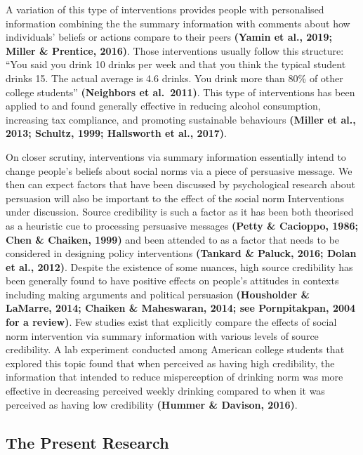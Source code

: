 \documentclass[
  11pt,
]{article}
\begin{document}
A variation of this type of interventions provides people with
personalised information combining the the summary information with
comments about how individuals' beliefs or actions compare to their
peers \textbf{(Yamin et al., 2019; Miller \& Prentice, 2016)}. Those
interventions usually follow this structure: ``You said you drink 10
drinks per week and that you think the typical student drinks 15. The
actual average is 4.6 drinks. You drink more than 80\% of other college
students'' \textbf{(Neighbors et al.~2011)}. This type of interventions
has been applied to and found generally effective in reducing alcohol
consumption, increasing tax compliance, and promoting sustainable
behaviours \textbf{(Miller et al., 2013; Schultz, 1999; Hallsworth et
al., 2017)}.

On closer scrutiny, interventions via summary information essentially
intend to change people's beliefs about social norms via a piece of
persuasive message. We then can expect factors that have been discussed
by psychological research about persuasion will also be important to the
effect of the social norm Interventions under discussion. Source
credibility is such a factor as it has been both theorised as a
heuristic cue to processing persuasive messages \textbf{(Petty \&
Cacioppo, 1986; Chen \& Chaiken, 1999)} and been attended to as a factor
that needs to be considered in designing policy interventions
\textbf{(Tankard \& Paluck, 2016; Dolan et al., 2012)}. Despite the
existence of some nuances, high source credibility has been generally
found to have positive effects on people's attitudes in contexts
including making arguments and political persuasion \textbf{(Housholder
\& LaMarre, 2014; Chaiken \& Maheswaran, 2014; see Pornpitakpan, 2004
for a review)}. Few studies exist that explicitly compare the effects of
social norm intervention via summary information with various levels of
source credibility. A lab experiment conducted among American college
students that explored this topic found that when perceived as having
high credibility, the information that intended to reduce misperception
of drinking norm was more effective in decreasing perceived weekly
drinking compared to when it was perceived as having low credibility
\textbf{(Hummer \& Davison, 2016)}.

\hypertarget{the-present-research}{%
\subsection{The Present Research}\label{the-present-research}}
\end{document}
